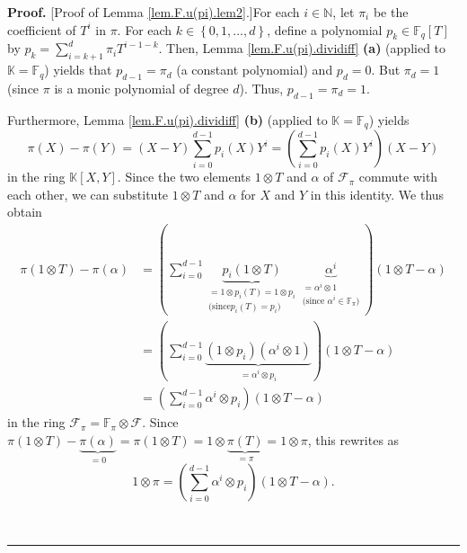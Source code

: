 \documentclass[numbers=enddot,12pt,final,onecolumn,notitlepage]{scrartcl}%
\theoremstyle{definition}
\newenvironment{proof}[1][Proof]{\noindent\textbf{#1.} }{\ \rule{0.5em}{0.5em}}
\let\sumnonlimits\sum
\renewcommand{\sum}{\sumnonlimits\limits}
\begin{document}
\begin{proof}
[Proof of Lemma \ref{lem.F.u(pi).lem2}.]For each $i\in\mathbb{N}$, let
$\pi_{i}$ be the coefficient of $T^{i}$ in $\pi$. For each $k\in\left\{
0,1,\ldots,d\right\}  $, define a polynomial $p_{k}\in\mathbb{F}_{q}\left[
T\right]  $ by $p_{k}=\sum_{i=k+1}^{d}\pi_{i}T^{i-1-k}$. Then, Lemma
\ref{lem.F.u(pi).dividiff} \textbf{(a)} (applied to $\mathbb{K}=\mathbb{F}%
_{q}$) yields that $p_{d-1}=\pi_{d}$ (a constant polynomial) and $p_{d}=0$.
But $\pi_{d}=1$ (since $\pi$ is a monic polynomial of degree $d$). Thus,
$p_{d-1}=\pi_{d}=1$.

Furthermore, Lemma \ref{lem.F.u(pi).dividiff} \textbf{(b)} (applied to
$\mathbb{K}=\mathbb{F}_{q}$) yields
\[
\pi\left(  X\right)  -\pi\left(  Y\right)  =\left(  X-Y\right)  \sum
_{i=0}^{d-1}p_{i}\left(  X\right)  Y^{i}=\left(  \sum_{i=0}^{d-1}p_{i}\left(
X\right)  Y^{i}\right)  \left(  X-Y\right)
\]
in the ring $\mathbb{K}\left[  X,Y\right]  $. Since the two elements $1\otimes
T$ and $\alpha$ of $\mathcal{F}_{\pi}$ commute with each other, we can
substitute $1\otimes T$ and $\alpha$ for $X$ and $Y$ in this identity. We thus
obtain%
\begin{align*}
\pi\left(  1\otimes T\right)  -\pi\left(  \alpha\right)   &  =\left(
\sum_{i=0}^{d-1}\underbrace{p_{i}\left(  1\otimes T\right)  }%
_{\substack{=1\otimes p_{i}\left(  T\right)  =1\otimes p_{i}\\\text{(since
}p_{i}\left(  T\right)  =p_{i}\text{)}}}\underbrace{\alpha^{i}}%
_{\substack{=\alpha^{i}\otimes1\\\text{(since }\alpha^{i}\in\mathbb{F}_{\pi
}\text{)}}}\right)  \left(  1\otimes T-\alpha\right) \\
&  =\left(  \sum_{i=0}^{d-1}\underbrace{\left(  1\otimes p_{i}\right)  \left(
\alpha^{i}\otimes1\right)  }_{=\alpha^{i}\otimes p_{i}}\right)  \left(
1\otimes T-\alpha\right) \\
&  =\left(  \sum_{i=0}^{d-1}\alpha^{i}\otimes p_{i}\right)  \left(  1\otimes
T-\alpha\right)
\end{align*}
in the ring $\mathcal{F}_{\pi}=\mathbb{F}_{\pi}\otimes\mathcal{F}$. Since
$\pi\left(  1\otimes T\right)  -\underbrace{\pi\left(  \alpha\right)  }%
_{=0}=\pi\left(  1\otimes T\right)  =1\otimes\underbrace{\pi\left(  T\right)
}_{=\pi}=1\otimes\pi$, this rewrites as
\begin{equation}
1\otimes\pi=\left(  \sum_{i=0}^{d-1}\alpha^{i}\otimes p_{i}\right)  \left(
1\otimes T-\alpha\right)  . \label{pf.lem.F.u(pi).lem2.1}%
\end{equation}



\end{proof}
\end{document}
